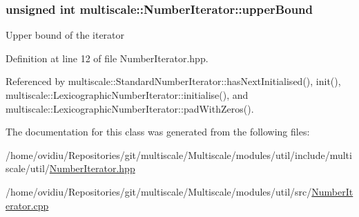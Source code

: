 \hypertarget{classmultiscale_1_1NumberIterator_a56a5558958778bbde64e249d67cba886}{
\subsubsection[{upper\-Bound}]{\setlength{\rightskip}{0pt plus 5cm}unsigned int {\bf multiscale\-::\-Number\-Iterator\-::upper\-Bound}}}\label{classmultiscale_1_1NumberIterator_a56a5558958778bbde64e249d67cba886}
\-Upper bound of the iterator 

\-Definition at line 12 of file \-Number\-Iterator.\-hpp.



\-Referenced by multiscale\-::\-Standard\-Number\-Iterator\-::has\-Next\-Initialised(), init(), multiscale\-::\-Lexicographic\-Number\-Iterator\-::initialise(), and multiscale\-::\-Lexicographic\-Number\-Iterator\-::pad\-With\-Zeros().



\-The documentation for this class was generated from the following files\-:\begin{DoxyCompactItemize}
\item 
/home/ovidiu/\-Repositories/git/multiscale/\-Multiscale/modules/util/include/multiscale/util/\hyperlink{NumberIterator_8hpp}{\-Number\-Iterator.\-hpp}\item 
/home/ovidiu/\-Repositories/git/multiscale/\-Multiscale/modules/util/src/\hyperlink{NumberIterator_8cpp}{\-Number\-Iterator.\-cpp}\end{DoxyCompactItemize}
